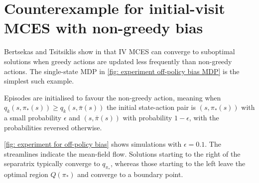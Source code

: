 
\newpage
\section{Counterexample for initial-visit MCES with non-greedy bias}
\label{app: non greedy}

Bertsekas and Tsitsiklis show in \cite[Example~5.12]{Bertsekas1996Neuro-DynamicProgramming} that IV MCES can converge to suboptimal solutions when greedy actions are updated less frequently than non-greedy actions.
The single-state MDP in \autoref{fig: experiment off-policy bias MDP} is the simplest such example.

Episodes are initialised to favour the non-greedy action,
meaning
when $q_k(s,\pi_*(s)) \ge q_k(s,\bar\pi(s))$
the initial state-action pair is $(s,\pi_*(s))$ with a small probability $\epsilon$ and $(s,\bar\pi(s))$ with probability $1-\epsilon$,
with the probabilities reversed otherwise.

\autoref{fig: experiment for off-policy bias} shows simulations with $\epsilon = 0.1$. The streamlines indicate the mean-field flow.
Solutions starting to the right of the separatrix typically converge to $q_{\pi_*}$, whereas those starting to the left leave the optimal region $Q(\pi_*)$ and converge to a boundary point.





